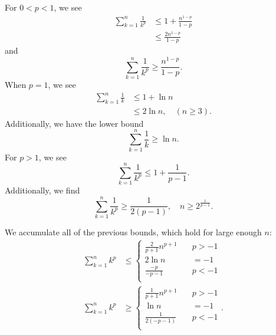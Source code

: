 \noindent
For $0<p<1$, we see
%
\begin{align}
    \sum_{k=1}^{n}\frac{1}{k^{p}} &\le 1 + \frac{n^{1-p}}{1-p} \nonumber\\
        &\le \frac{2n^{1-p}}{1-p}
\end{align}
%
and
%
\begin{equation}
    \sum_{k=1}^{n}\frac{1}{k^{p}} \ge \frac{n^{1-p}}{1-p}.
\end{equation}
%
When $p=1$, we see
%
\begin{align}
    \sum_{k=1}^{n} \frac{1}{k} &\le 1 + \ln n \nonumber\\
        &\le 2\ln n, \quad (n\ge3).
\end{align}
%
Additionally, we have the lower bound
%
\begin{equation}
    \sum_{k=1}^{n} \frac{1}{k} \ge \ln n.
\end{equation}
%
For $p > 1$, we see
%
\begin{equation}
    \sum_{k=1}^{n} \frac{1}{k^{p}} \le 1 + \frac{1}{p-1}.
\end{equation}
%
Additionally, we find
%
\begin{equation}
    \sum_{k=1}^{n} \frac{1}{k^{p}} \ge \frac{1}{2(p-1)},
        \quad n\ge 2^{\frac{1}{p-1}}.
\end{equation}

We accumulate all of the previous bounds, which hold for large enough $n$:
%
\begin{align}
    \sum_{k=1}^{n}k^{p} &\le \begin{cases}
        \frac{2}{p+1}n^{p+1} \quad &p>-1 \\
        2\ln n \quad &=-1 \\
        \frac{-p}{-p-1} \quad &p<-1\\
    \end{cases} \nonumber\\
    \sum_{k=1}^{n}k^{p} &\ge \begin{cases}
        \frac{1}{p+1}n^{p+1} \quad &p>-1 \\
        \ln n \quad &=-1 \\
        \frac{1}{2(-p-1)} \quad &p<-1\\
    \end{cases}.
    \label{eq:bound_xp_01}
\end{align}



